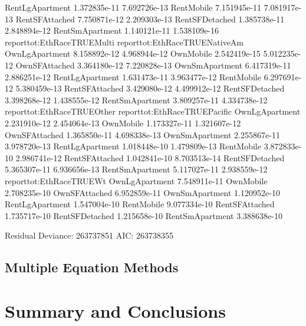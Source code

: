 \documentclass{article}
\begin{document}
\begin{Schunk}
\begin{Soutput}
RentLgApartment              1.372835e-11               7.692726e-13
RentMobile                   7.151945e-11               7.081917e-13
RentSFAttached               7.750871e-12               2.209303e-13
RentSFDetached               1.385738e-11               2.848894e-12
RentSmApartment              1.140121e-11               1.538109e-16
                reporttot:EthRaceTRUEMulti reporttot:EthRaceTRUENativeAm
OwnLgApartment                8.158892e-12                  4.968944e-12
OwnMobile                     2.542419e-15                  5.012235e-12
OwnSFAttached                 3.364180e-12                  7.220828e-13
OwnSmApartment                6.417319e-11                  2.886251e-12
RentLgApartment               1.631473e-11                  3.963477e-12
RentMobile                    6.297691e-12                  5.380459e-13
RentSFAttached                3.429080e-12                  4.499912e-12
RentSFDetached                3.398268e-12                  1.438555e-12
RentSmApartment               3.809257e-11                  4.334738e-12
                reporttot:EthRaceTRUEOther reporttot:EthRaceTRUEPacific
OwnLgApartment                2.231910e-12                 2.454064e-13
OwnMobile                     1.173327e-11                 1.321607e-12
OwnSFAttached                 1.365850e-11                 4.698338e-13
OwnSmApartment                2.255867e-11                 3.978720e-13
RentLgApartment               1.018448e-10                 1.479809e-13
RentMobile                    3.872833e-10                 2.986741e-12
RentSFAttached                1.042841e-10                 8.703513e-14
RentSFDetached                5.365307e-11                 6.936656e-13
RentSmApartment               5.117027e-11                 2.938559e-12
                reporttot:EthRaceTRUEWt
OwnLgApartment             7.548911e-11
OwnMobile                  2.708235e-10
OwnSFAttached              6.952859e-11
OwnSmApartment             1.120952e-10
RentLgApartment            1.547004e-10
RentMobile                 9.077334e-10
RentSFAttached             1.735717e-10
RentSFDetached             1.215658e-10
RentSmApartment            3.388638e-10

Residual Deviance: 263737851 
AIC: 263738355 
\end{Soutput}
\end{Schunk}

  
  \subsection{Multiple Equation Methods}



\section{Summary and Conclusions}

\nocite{*}


\end{document}
